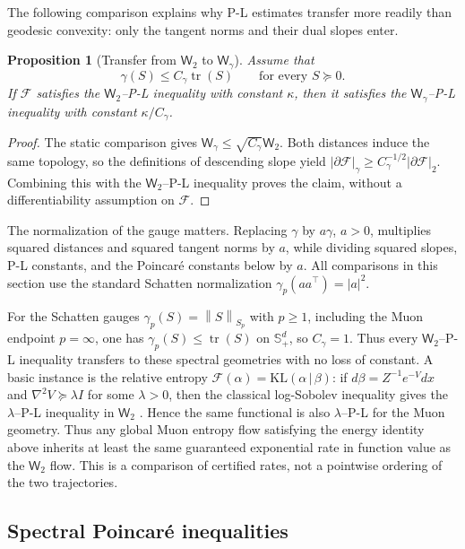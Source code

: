 \documentclass{article}
\newtheorem{proposition}[theorem]{Proposition}
\newcommand{\MF}{\mathcal{F}}
\newcommand{\Wtwo}{\mathsf{W}_2}
\newcommand{\Wg}{\mathsf{W}_{\gamma}}
\newcommand{\tr}{\operatorname{tr}}
\newcommand{\norm}[1]{\left\lVert #1 \right\rVert}
\newcommand{\KL}{\mathrm{KL}}
\begin{document}
The following comparison explains why P-L estimates transfer more readily
than geodesic convexity: only the tangent norms and their dual slopes enter.

\begin{proposition}[Transfer from $\Wtwo$ to $\Wg$]
\label{prop:pl-transfer}
Assume that
\[
    \gamma(S)\le C_\gamma\tr(S)
    \qquad
    \text{for every }S\succeq0 .
\]
If $\MF$ satisfies the $\Wtwo$--P-L inequality with constant $\kappa$, then it
satisfies the $\Wg$--P-L inequality with constant $\kappa/C_\gamma$.
\end{proposition}

\begin{proof}
The static comparison gives $\Wg\le\sqrt{C_\gamma}\Wtwo$.
Both distances induce the same topology, so the definitions of descending
slope yield $|\partial\MF|_\gamma\ge
C_\gamma^{-1/2}|\partial\MF|_2$. Combining this with the
$\Wtwo$--P-L inequality proves the claim, without a differentiability
assumption on $\MF$.
\end{proof}

The normalization of the gauge matters.  Replacing $\gamma$ by $a\gamma$,
$a>0$, multiplies squared distances and squared tangent norms by $a$, while
dividing squared slopes, P-L constants, and the Poincar\'e constants below by
$a$.
All comparisons in this section use the standard Schatten normalization
$\gamma_p(aa^\top)=|a|^2$.

For the Schatten gauges $\gamma_p(S)=\norm{S}_{S_p}$ with $p\ge1$, including
the Muon endpoint $p=\infty$, one has
$\gamma_p(S)\le\tr(S)$ on $\mathbb S_+^d$, so $C_\gamma=1$.  Thus every
$\Wtwo$--P-L inequality transfers to these spectral geometries with no loss of
constant.  A basic instance is the relative entropy
$\MF(\alpha)=\KL(\alpha\,|\,\beta)$: if
$d\beta=Z^{-1}e^{-V}dx$ and $\nabla^2V\succeq\lambda I$ for some $\lambda>0$,
then the classical
log-Sobolev inequality gives the $\lambda$--P-L inequality in $\Wtwo$
\citep{BakryGentilLedoux2014,Villani2009}. Hence the same functional is also $\lambda$--P-L for
the Muon geometry. Thus any global Muon entropy flow satisfying the energy
identity above inherits at least the same guaranteed exponential rate in
function value as the $\Wtwo$ flow. This is a comparison
of certified rates, not a pointwise ordering of the two trajectories.

\subsection{Spectral Poincar\'e inequalities}
\end{document}

